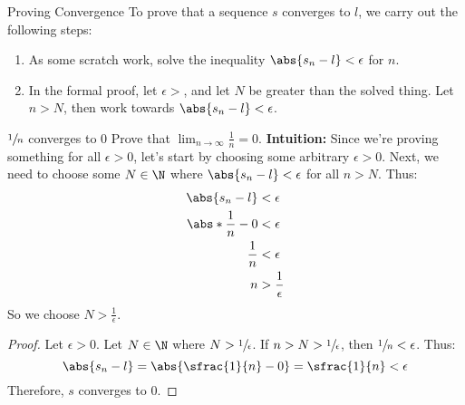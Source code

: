 \begin{tecbox}{Proving Convergence}{}
    To prove that a sequence $s$ converges to $l$, we carry out the following steps:
    \begin{enumerate}
        \item As some scratch work, solve the inequality $\abs{s_n - l} < \epsilon$ for $n$.
        \item In the formal proof, let $\epsilon > $, and let $N$ be greater than the solved thing. Let $n > N$, then work towards $\abs{s_n - l} < \epsilon$.
    \end{enumerate}
\end{tecbox}

\begin{exbox}{$\sfrac{1}{n}$ converges to $0$}{}
    Prove that $\lim_{n \to \infty} \frac{1}{n} = 0$.
    \tcblower
    \textbf{Intuition:} Since we're proving something for all $\epsilon > 0$, let's start by choosing some arbitrary $\epsilon > 0$. Next, we need to choose some $N \in \N$ where $\abs{s_n - l} < \epsilon$ for all $n > N$. Thus:
    \begin{align*}
        \abs{s_n - l} &< \epsilon \\
        \abs*{\frac{1}{n} - 0} &< \epsilon \\
        \frac{1}{n} &< \epsilon \\
        n &> \frac{1}{\epsilon}
    \end{align*}
    So we choose $N > \frac{1}{\epsilon}$.

    \begin{proof}
        Let $\epsilon > 0$. Let $N \in \N$ where $N > \sfrac{1}{\epsilon}$. If $n > N > \sfrac{1}{\epsilon}$, then $\sfrac{1}{n} < \epsilon$. Thus:
        \[ \abs{s_n - l} = \abs{\sfrac{1}{n} - 0} = \sfrac{1}{n} < \epsilon \]
        Therefore, $s$ converges to $0$.
    \end{proof}
\end{exbox}

